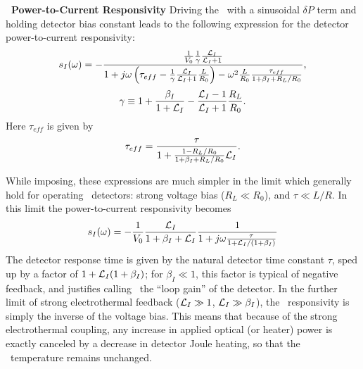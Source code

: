 \textbf{\TES\ Power-to-Current Responsivity}
Driving the \TES\ with a sinusoidal $\delta P$ term and holding detector bias constant leads to the following expression for the detector power-to-current responsivity:
\begin{equation}\label{eqn:si-full}
s_I(\omega) = 
- \frac{ \frac{1}{V_0} \frac{1}{\gamma} \frac{\mathcal{L}_I}{\mathcal{L}_I + 1} }
       { 1 + j \omega \left( \tau_{eff} - \frac{1}{\gamma}\frac{\mathcal{L}_I}{\mathcal{L}_I + 1} \frac{L}{R_0}\right) - \omega^2 \frac{L}{R_0}\frac{\tau_{eff}}{1 + \beta_I + R_L / R_0}},
\end{equation}
\begin{equation}
\gamma \equiv 1 + \frac{\beta_I}{1+\mathcal{L}_I} - \frac{\mathcal{L}_I - 1}{\mathcal{L}_I + 1}\frac{R_L}{R_0}.
\end{equation}
Here $\tau_{eff}$ is given by
\begin{equation} \label{eqn:teff}
  \tau_{eff} = \frac{\tau}{1 + \frac{1 - R_L / R_0}{1 + \beta_I + R_L / R_0} \mathcal{L}_I}.
\end{equation}

While imposing, these expressions are much simpler in the limit which generally hold for operating \TES\ detectors: strong voltage bias ($R_L \ll R_0$), and $\tau \ll L/R$. 
In this limit the power-to-current responsivity becomes
\begin{equation}
s_I(\omega) = -\frac{1}{V_0} \frac{\mathcal{L}_I}{1+\beta_I + \mathcal{L}_I} \frac{1}{1 + j \omega \frac{\tau}{1 +\mathcal{L}_I/(1+\beta_I)}}
\end{equation}
The detector response time is given by the natural detector time constant $\tau$, sped up by a factor of $1 + \mathcal{L}_I(1+\beta_I)$; for $\beta_I \ll 1$, this factor is typical of negative feedback, and justifies calling \Loop\ the ``loop gain'' of the detector.
In the further limit of strong electrothermal feedback ($\mathcal{L}_I \gg 1$, $\mathcal{L}_I \gg \beta_I$), the \DC\ responsivity is simply the inverse of the voltage bias.
This means that because of the strong electrothermal coupling, any increase in applied optical (or heater) power is exactly canceled by a decrease in detector Joule heating, so that the \TES\ temperature remains unchanged.

